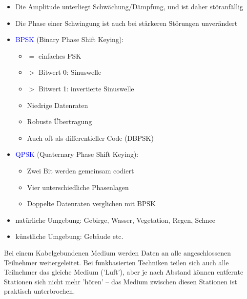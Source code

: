 \begin{itemize}
    \item Die Amplitude unterliegt Schwächung/Dämpfung, und ist daher störanfällig
    \item Die Phase einer Schwingung ist auch bei stärkeren Störungen unverändert
\end{itemize}

\begin{itemize}
    \item \textcolor{blue}{BPSK} (Binary Phase Shift Keying):
    \begin{itemize}
        \item $=$ einfaches PSK
        \item $>$ Bitwert 0: Sinuswelle
        \item $>$ Bitwert 1: invertierte Sinuswelle
        \item Niedrige Datenraten
        \item Robuste Übertragung
        \item Auch oft als differentieller Code (DBPSK)
    \end{itemize}
    \item \textcolor{blue}{QPSK} (Quaternary Phase Shift Keying):
    \begin{itemize}
        \item Zwei Bit werden gemeinsam codiert
        \item Vier unterschiedliche Phasenlagen
        \item Doppelte Datenraten verglichen mit BPSK
    \end{itemize}
\end{itemize}

\begin{itemize}
    \item natürliche Umgebung: Gebirge, Wasser, Vegetation, Regen, Schnee
    \item künstliche Umgebung: Gebäude etc.
\end{itemize}

Bei einem Kabelgebundenen Medium werden Daten an alle angeschlossenen Teilnehmer weitergeleitet.
Bei funkbasierten Techniken teilen sich auch alle Teilnehmer das gleiche Medium ('Luft'), aber je nach Abstand können entfernte Stationen sich nicht mehr 'hören' -- das Medium zwischen diesen Stationen ist praktisch unterbrochen.

